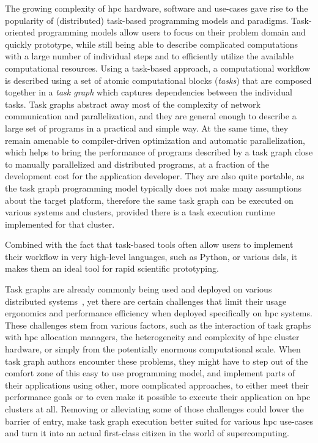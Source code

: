 The growing complexity of \gls{hpc} hardware, software and use-cases gave rise to the
popularity of (distributed) task-based programming models and paradigms. Task-oriented programming
models allow users to focus on their problem domain and quickly prototype, while still being able
to describe complicated computations with a large number of individual steps and to efficiently
utilize the available computational resources. Using a task-based approach, a computational
workflow is described using a set of atomic computational blocks (\emph{tasks}) that are
composed together in a \emph{task graph} which captures dependencies between the individual
tasks. Task graphs abstract away most of the complexity of network communication and
parallelization, and they are general enough to describe a large set of programs in a practical and
simple way. At the same time, they remain amenable to compiler-driven optimization and automatic
parallelization, which helps to bring the performance of programs described by a task graph close
to manually parallelized and distributed programs, at a fraction of the development cost for the
application developer. They are also quite portable, as the task graph programming model typically
does not make many assumptions about the target platform, therefore the same task graph can be
executed on various systems and clusters, provided there is a task execution runtime implemented
for that cluster.

Combined with the fact that task-based tools often allow users to implement their workflow in very
high-level languages, such as Python, or various \glspl{dsl}, it makes them an ideal
tool for rapid scientific prototyping.

Task graphs are already commonly being used and deployed on various distributed
systems~\cite{pegasus, workflows_at_scale, large_scale_modelling}, yet there are certain challenges that limit their usage ergonomics
and performance efficiency when deployed specifically on \gls{hpc} systems. These
challenges stem from various factors, such as the interaction of task graphs with
\gls{hpc} allocation managers, the heterogeneity and complexity of
\gls{hpc} cluster hardware, or simply from the potentially enormous computational
scale. When task graph authors encounter these problems, they might have to step out of the comfort
zone of this easy to use programming model, and implement parts of their applications using other,
more complicated approaches, to either meet their performance goals or to even make it possible to
execute their application on \gls{hpc} clusters at all. Removing or alleviating some
of those challenges could lower the barrier of entry, make task graph execution better suited for
various \gls{hpc} use-cases and turn it into an actual first-class citizen in the
world of supercomputing\@.

